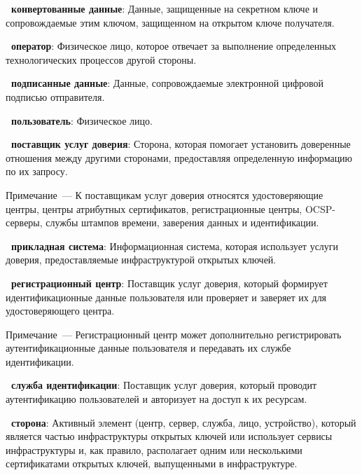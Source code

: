 {\bf \thedefctr~конвертованные данные}:
Данные, защищенные на секретном ключе и сопровождаемые этим ключом, 
защищенном на открытом ключе получателя.  

{\bf \thedefctr~оператор}:
Физическое лицо, которое отвечает за выполнение определенных 
технологических процессов другой стороны.

{\bf \thedefctr~подписанные данные}:
Данные, сопровождаемые электронной цифровой подписью отправителя. 

{\bf\thedefctr~пользователь}: 
Физическое лицо.

{\bf\thedefctr~поставщик услуг доверия}:
Сторона, которая помогает установить доверенные отношения между другими 
сторонами, предоставляя определенную информацию по их запросу.

\begin{note}
Примечание~--- К поставщикам услуг доверия относятся удостоверяющие 
центры, центры атрибутных сертификатов, регистрационные центры, 
OCSP-серверы, службы штампов времени, заверения данных и идентификации.
\end{note}

{\bf\thedefctr~прикладная система}:
Информационная система, которая использует услуги доверия,
предоставляемые инфраструктурой открытых ключей.
%

{\bf\thedefctr~регистрационный центр}: 
Поставщик услуг доверия, который формирует идентификационные данные 
пользователя или проверяет и заверяет их для удостоверяющего центра.

\begin{note}
Примечание~--- Регистрационный центр может дополнительно регистрировать 
аутентификационные данные пользователя и передавать их службе 
идентификации.
\end{note}

{\bf\thedefctr~служба идентификации}: 
Поставщик услуг доверия, который проводит аутентификацию 
пользователей и авторизует на доступ к их ресурсам.
%

{\bf\thedefctr~сторона}: 
Активный элемент (центр, сервер, служба, лицо, устройство), который является 
частью инфраструктуры открытых ключей или использует сервисы 
инфраструктуры и, как правило, располагает одним или несколькими 
сертификатами открытых ключей, выпущенными в инфраструктуре.

